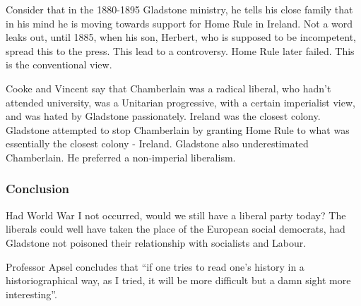 		Consider that in the 1880-1895 Gladstone ministry, he tells his close family that in his mind he is moving towards support for Home Rule in Ireland. Not a word leaks out, until 1885, when his son, Herbert, who is supposed to be incompetent, spread this to the press. This lead to a controversy. Home Rule later failed. This is the conventional view.

		Cooke and Vincent say that Chamberlain was a radical liberal, who hadn't attended university, was a Unitarian progressive, with a certain imperialist view, and was hated by Gladstone passionately. Ireland was the closest colony. Gladstone attempted to stop Chamberlain by granting Home Rule to what was essentially the closest colony - Ireland. Gladstone also underestimated Chamberlain. He preferred a non-imperial liberalism.

		\subsubsection{Conclusion}

		Had World War I not occurred, would we still have a liberal party today? The liberals could well have taken the place of the European social democrats, had Gladstone not poisoned their relationship with socialists and Labour.

		Professor Apsel concludes that ``if one tries to read one's history in a historiographical way, as I tried, it will be more difficult but a damn sight more interesting''.
